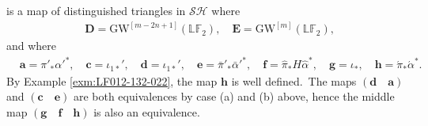 \documentclass[a4paper]{amsart}
\theoremstyle{plain}
\theoremstyle{definition}
\numberwithin{equation}{section}
\newcommand{\GW}{\mathrm{GW}}
\begin{document}
is a map of distinguished triangles in $\mathcal{SH}$ where
\begin{align*}
     & \mathbf{D} = \GW^{[m-2n+1]}(\mathbb{LF}_2), \quad\mathbf{E} = \GW^{[m]}(\mathbb{LF}_2),
\end{align*}
and where
\begin{align*}
     & \mathbf{a}=\pi'_{\ast} \alpha'^{*},\quad \mathbf{c} = \iota_{1*}',\quad \mathbf{d} = \iota_{1*}',\quad \mathbf{e} = \bar{\pi}'_* \bar{\alpha}'^{*}, \quad
    \mathbf{f}=\hat{\pi}_*H\hat{\alpha}^*,\quad \mathbf{g} = \iota_*,\quad \mathbf{h}=\acute{\pi}_* \acute{\alpha}^*.
\end{align*}
By Example \ref{exm:LF012-132-022}, the map $\mathbf{h}$ is well defined.\ The maps $(\mathbf{d} \quad \mathbf{a})$ and $(\mathbf{c} \quad \mathbf{e})$ are both equivalences by case (a) and (b) above, hence the middle map $(\mathbf{g} \quad \mathbf{f}\quad \mathbf{h})$ is also an equivalence.
\end{document}
